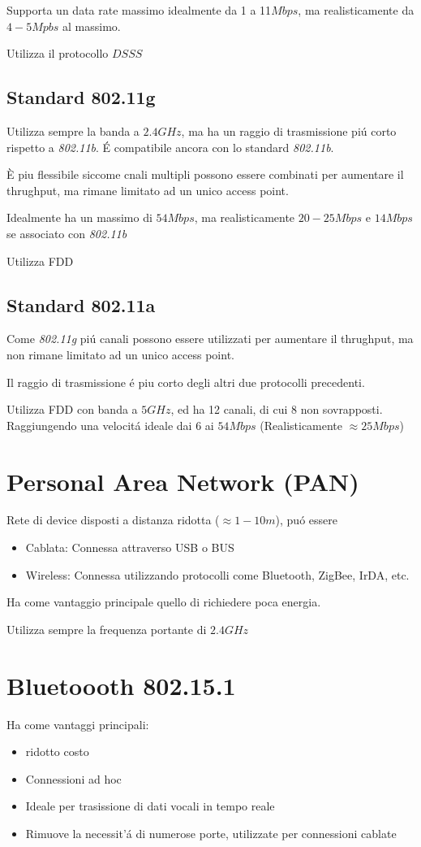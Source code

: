 \documentclass{article}
\begin{document}
Supporta un data rate massimo idealmente da 1 a 11$Mbps$, ma realisticamente da $4-5Mpbs$ al massimo.

Utilizza il protocollo $DSSS$

\subsection{Standard 802.11g}
Utilizza sempre la banda a $2.4GHz$, ma ha un raggio di trasmissione pi\'u corto rispetto a \textit{802.11b}. \'E compatibile ancora con lo standard \textit{802.11b}.

\`E piu flessibile siccome cnali multipli possono essere combinati per aumentare il thrughput, ma rimane limitato ad un unico access point.

Idealmente ha un massimo di $54 Mbps$, ma realisticamente $20-25 Mbps$ e $14 Mbps$ se associato con \textit{802.11b}

Utilizza FDD
\subsection{Standard 802.11a}

Come \textit{802.11g} pi\'u canali possono essere utilizzati per aumentare il thrughput, ma non rimane limitato ad un unico access point.

Il raggio di trasmissione \'e piu corto degli altri due protocolli precedenti.

Utilizza FDD con banda a $5GHz$, ed ha 12 canali, di cui 8 non sovrapposti. Raggiungendo una velocit\'a ideale dai 6 ai $54Mbps$ (Realisticamente $\approx 25 Mbps$)
\newpage
\section{Personal Area Network (PAN)}
Rete di device disposti a distanza ridotta ($\approx 1-10m$), pu\'o essere
\begin{itemize}
    \item Cablata: Connessa attraverso USB o BUS
    \item Wireless: Connessa utilizzando protocolli come Bluetooth, ZigBee, IrDA, etc.
\end{itemize}

Ha come vantaggio principale quello di richiedere poca energia.

Utilizza sempre la frequenza portante di $2.4GHz$

\section{Bluetoooth 802.15.1}
Ha come vantaggi principali:
\begin{itemize}
     \item ridotto costo
     \item Connessioni ad hoc
     \item Ideale per trasissione di dati vocali in tempo reale
     \item Rimuove la necessit'\'a di numerose porte, utilizzate per connessioni cablate
\end{itemize}
\end{document}
